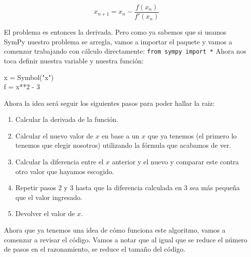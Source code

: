 \documentclass[10pt,letterpaper]{article}
\newcommand{\inlinecode}[1]{
\colorbox{light-gray}{\texttt{#1}}
}
\newenvironment{Code}
{
\begin{lrbox}{\selvestebox}%
\begin{minipage}{\dimexpr\columnwidth-2\fboxsep\relax}
\fontfamily{\ttdefault}\selectfont
}
{\end{minipage}\end{lrbox}%
\begin{center}
\colorbox{light-gray}{\usebox{\selvestebox}}
\end{center}
}
\begin{document}
\begin{equation}
x_{n+1} = x_n - \frac{f \left( x_n \right)}{f' \left( x_n \right)}
\end{equation}

El problema es entonces la derivada. Pero como ya sabemos que si usamos SymPy nuestro problema se arregla, vamos a importar el paquete y vamos a comenzar trabajando con c\'alculo directamente: \inlinecode{from sympy import *} Ahora nos toca definir nuestra variable y nuestra funci\'on:

\begin{footnotesize}
\begin{Code}
x = Symbol("x")\\
f = x**2 - 3
\end{Code}
\end{footnotesize}

Ahora la idea ser\'a seguir los siguientes pasos para poder hallar la raiz:

\begin{enumerate}
\item Calcular la derivada de la funci\'on.
\item Calcular el nuevo valor de $x$ en base a un $x$ que ya tenemos (el primero lo tenemos que elegir nosotros) utilizando la f\'ormula que acabamos de ver.
\item Calcular la diferencia entre el $x$ anterior y el nuevo y comparar este contra otro valor que hayamos escogido.
\item Repetir pasos 2 y 3 hasta que la diferencia calculada en 3 sea m\'as peque\~na que el valor ingresado.
\item Devolver el valor de $x$.
\end{enumerate}

Ahora que ya tenemos una idea de c\'omo funciona este algoritmo, vamos a comenzar a revisar el c\'odigo. Vamos a notar que al igual que se reduce el n\'umero de pasos en el razonamiento, se reduce el tama\~no del c\'odigo.
\end{document}
